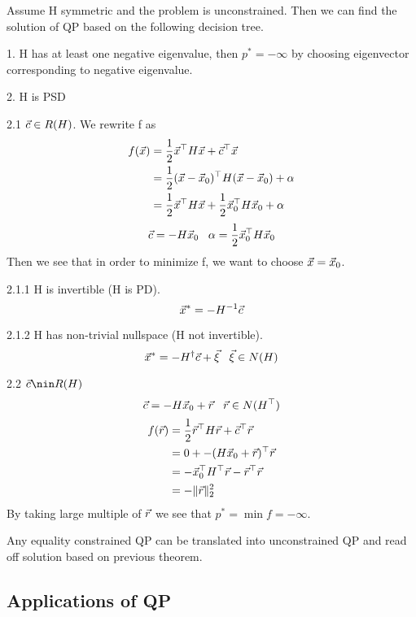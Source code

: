 \begin{theorem}
	Assume H symmetric and the problem is unconstrained. Then we can find the solution of QP based on the following decision tree.

	1. H has at least one negative eigenvalue, then $p^* = -\infty$ by choosing eigenvector corresponding to negative eigenvalue.

	2. H is PSD

	2.1 $\vec{c}\in R(H)$. We rewrite f as
	\begin{align*}
		f(\vec{x}) &= \frac{1}{2}\vec{x}^\top H\vec{x}+\vec{c}^\top\vec{x}\\
		&= \frac{1}{2}(\vec{x}-\vec{x}_0)^\top H(\vec{x}-\vec{x}_0)+\alpha\\
		&= \frac{1}{2}\vec{x}^\top H\vec{x}+\frac{1}{2}\vec{x}_0^\top H\vec{x}_0+\alpha
	\end{align*}
	\[\vec{c} = -H\vec{x}_0 \;\;\; \alpha = \frac{1}{2}\vec{x}_0^\top H\vec{x}_0\]
	Then we see that in order to minimize f, we want to choose $\vec{x} = \vec{x}_0$.

	2.1.1 H is invertible (H is PD).
	\[
\vec{x}^* = -H^{-1}\vec{c}
	\]

	2.1.2 H has non-trivial nullspace (H not invertible).
	\[
\vec{x}^* = -H^\dagger\vec{c}+\vec{\xi}\;\;\;\vec{\xi}\in N(H)
	\]

	2.2 $\v{c}\nin R(H)$
	\[\vec{c} = -H\vec{x}_0+\vec{r} \;\;\; \vec{r}\in N(H^\top)\]
	\begin{align*}
		f(\vec{r}) &= \frac{1}{2}\vec{r}^\top H\vec{r}+\vec{c}^\top\vec{r}\\
		&= 0+ -(H\vec{x}_0+\vec{r})^\top\vec{r}\\
		&= -\vec{x}_0^\top H^\top\vec{r} -\vec{r}^\top\vec{r}\\
		&=-\|\vec{r}\|_2^2
	\end{align*}
	By taking large multiple of $\vec{r}$ we see that $p^* = \min f = -\infty$.
\end{theorem}

\begin{theorem}
	Any equality constrained QP can be translated into unconstrained QP and read off solution based on previous theorem.
\end{theorem}


\subsection{Applications of QP} %
\label{sub:applications_of_qp}

